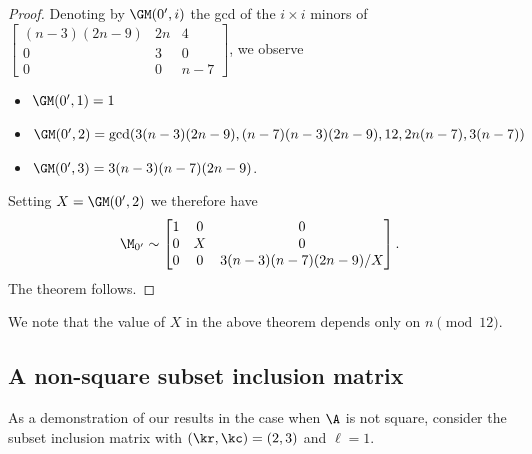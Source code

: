 \begin{proof}
Denoting by $\GM(0^{\prime},i)$ the gcd of the $i \times i$ minors of $\begin{bmatrix}
   (n-3)(2n-9) & 2n& 4\\
    0& 3& 0\\
    0& 0& n-7
\end{bmatrix}$, we observe
\begin{itemize}
    \item $\GM(0^{\prime}, 1) = 1$
    \item $\GM(0^{\prime}, 2) = \gcd(3(n-3)(2n-9), (n-7)(n-3)(2n-9), 12, 2n(n-7), 3(n-7))$
    \item $\GM(0^{\prime}, 3) = 3(n-3)(n-7)(2n-9)$.
\end{itemize}
Setting $X = \GM(0^{\prime}, 2)$ we therefore have
\[
\M_{0^{\prime}} \sim \begin{bmatrix}
   1 & 0& 0\\
    0& X& 0\\
    0& 0& 3(n-3)(n-7)(2n-9)/X
\end{bmatrix}.
\]
The theorem follows.  
\end{proof}
We note that the value of $X$ in the above theorem depends only on $n \pmod{12}$.


\subsection{A non-square subset inclusion matrix}

As a demonstration of our results in the case when $\A$ is not square, consider the subset inclusion matrix with $(\kr,\kc) = (2, 3)$ and $\ell = 1$.

